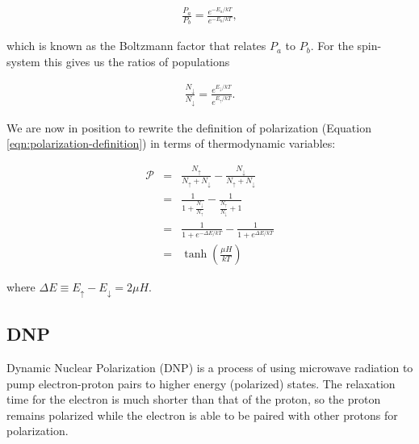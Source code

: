 \begin{eqnarray}
 \frac{P_a}{P_b} = \frac{e^{-E_a/kT}}{e^{-E_b/kT}},
\end{eqnarray}

which is known as the Boltzmann factor that relates $P_a$ to $P_b$.  For the spin-\half{} system this gives us the ratios of populations

\begin{eqnarray}
 \frac{N_\downarrow}{N_\downarrow} = \frac{e^{E_\downarrow/kT}}{e^{E_\uparrow/kT}}.
\end{eqnarray}


We are now in position to rewrite the definition of polarization (Equation \ref{eqn:polarization-definition}) in terms of thermodynamic variables:

\begin{eqnarray}
 \mathcal{P}&=&\frac{N_\uparrow}{N_\uparrow+N_\downarrow}-\frac{N_\downarrow}{N_\uparrow+N_\downarrow} \\
 &=& \frac{1}{1+\frac{N_\downarrow}{N_\uparrow}}-\frac{1}{\frac{N_\uparrow}{N_\downarrow}+1} \\
 &=& \frac{1}{1+e^{-\Delta E/kT}}-\frac{1}{1+e^{\Delta E/kT}} \\
 &=& \tanh\left(\frac{\mu H}{kT}\right)
\end{eqnarray}

where $\Delta E\equiv E_\uparrow-E_\downarrow = 2 \mu H$.

 \subsection{DNP}
Dynamic Nuclear Polarization (DNP) is a process of using microwave radiation to pump electron-proton pairs to higher energy (polarized) states.  The relaxation time for the electron is much shorter than that of the proton, so the proton remains polarized while the electron is able to be paired with other protons for polarization.


